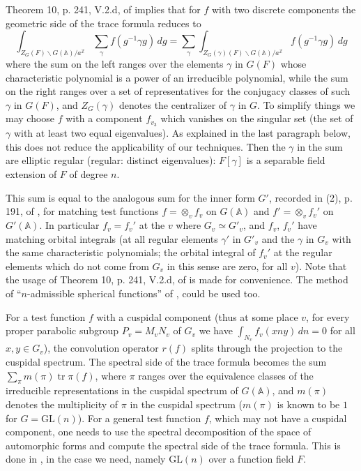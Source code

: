 \documentclass[11pt,a4paper]{article}
\theoremstyle{plain}
\theoremstyle{definition}
\DeclareMathOperator{\tr}{tr}
\newcommand{\Z}{\mathbb{Z}}
\newcommand{\GL}{\mathrm{GL}}
\begin{document}
Theorem 10, p. 241, V.2.d, of \cite{Laf} implies that for $f$ with two discrete components the geometric side of the trace formula reduces to
\[
\int_{Z_G(F) \backslash G(\mathbb{A})/a^{\Z}} \sum_\gamma f(g^{-1} \gamma g) \, dg = \sum_\gamma \int_{Z_G(\gamma)(F) \backslash G(\mathbb{A})/a^{\Z}} f(g^{-1} \gamma g) \, dg
\]
where the sum on the left ranges over the elements $\gamma$ in $G(F)$ whose characteristic polynomial is a power of an irreducible polynomial, while the sum on the right ranges over a set of representatives for the conjugacy classes of such $\gamma$ in $G(F)$, and $Z_G(\gamma)$ denotes the centralizer of $\gamma$ in $G$. To simplify things we may choose $f$ with a component $f_{v_3}$ which vanishes on the singular set (the set of $\gamma$ with at least two equal eigenvalues). As explained in the last paragraph below, this does not reduce the applicability of our techniques. Then the $\gamma$ in the sum are elliptic regular (regular: distinct eigenvalues): $F[\gamma]$ is a separable field extension of $F$ of degree $n$.

This sum is equal to the analogous sum for the inner form $G'$, recorded in (2), p. 191, of \cite{FK}, for matching test functions $f = \otimes_v f_v$ on $G(\mathbb{A})$ and $f' = \otimes_v f_v'$ on $G'(\mathbb{A})$. In particular $f_v = f_v'$ at the $v$ where $G_v \simeq G'_v$, and $f_v$, $f_v'$ have matching orbital integrals (at all regular elements $\gamma'$ in $G'_v$ and the $\gamma$ in $G_v$ with the same characteristic polynomials; the orbital integral of $f_v'$ at the regular elements which do not come from $G_v$ in this sense are zero, for all $v$). Note that the usage of Theorem 10, p. 241, V.2.d, of \cite{Laf} is made for convenience. The method of ``$n$-admissible spherical functions'' of \cite[ p. 192]{FK}, could be used too.

For a test function $f$ with a cuspidal component (thus at some place $v$, for every proper parabolic subgroup $P_v = M_v N_v$ of $G_v$ we have $\int_{N_v} f_v(x n y) \, dn = 0$ for all $x, y \in G_v$), the convolution operator $r(f)$ splits through the projection to the cuspidal spectrum. The spectral side of the trace formula becomes the sum $\sum_\pi m(\pi) \tr \pi(f)$, where $\pi$ ranges over the equivalence classes of the irreducible representations in the cuspidal spectrum of $G(\mathbb{A})$, and $m(\pi)$ denotes the multiplicity of $\pi$ in the cuspidal spectrum ($m(\pi)$ is known to be $1$ for $G = \GL(n)$). For a general test function $f$, which may not have a cuspidal component, one needs to use the spectral decomposition of the space of automorphic forms and compute the spectral side of the trace formula. This is done in \cite[Theorem 12, p. 309, VI.2.f]{Laf}, in the case we need, namely $\GL(n)$ over a function field $F$.
\end{document}
